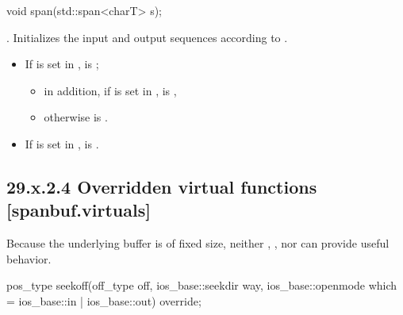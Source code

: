 \documentclass[ebook,11pt,article]{memoir}
\begin{document}
\begin{itemdecl}
void span(std::span<charT> s);
\end{itemdecl}

\begin{itemdescr}
\pnum
\effects 
{}. Initializes the input and output sequences according to .


\pnum
\postconditions 
\begin{itemize}
\item If  is set in , 
 \tcode{\&\&}  is ; 
\begin{itemize}
\item in addition, 
if  is set in ,
 is , 
\item otherwise  is . 
\end{itemize}
\item If  is set in , 
 \tcode{\&\&}   \tcode{\&\&}  is .
\end{itemize}


\end{itemdescr}

\subsection{29.x.2.4 Overridden virtual functions [spanbuf.virtuals]}
\pnum
\begin{note}
Because the underlying buffer is of fixed size, neither , , nor  can provide useful behavior.
\end{note}

\begin{itemdecl}
pos_type seekoff(off_type off, ios_base::seekdir way,
                 ios_base::openmode which
                   = ios_base::in | ios_base::out) override;
\end{itemdecl}
\end{document}
